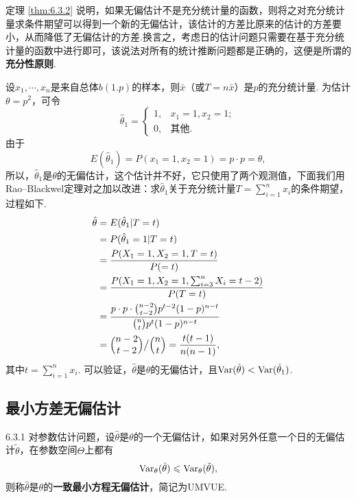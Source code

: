 定理 \ref{thm:6.3.2} 说明，如果无偏估计不是充分统计量的函数，则将之对充分统计量求条件期望可以得到一个新的无偏估计，该估计的方差比原来的估计的方差要小，从而降低了无偏估计的方差.换言之，考虑日的估计问题只需要在基于充分统计量的函数中进行即可，该说法对所有的统计推断问题都是正确的，这便是所谓的\textbf{充分性原则}. 

\begin{example}\label{exam:6.3.1}
  设$x_1,\cdots,x_n$是来自总体$b(1.p)$的样本，则$\bar x$（或$T=n\bar x$）是$p$的充分统计量. 为估计$\theta=p^2$，可令
  \[
    \hat\theta_1 = \begin{cases}
      1, & x_1=1, x_2=1; \\
      0, & \text{其他}.
    \end{cases}
  \]
  由于
  \[
    E(\hat\theta_1) = P(x_1=1,x_2=1) = p\cdot p =\theta,
  \]
  所以，$\hat\theta_1$是$\theta$的无偏估计，这个估计并不好，它只使用了两个观测值，下面我们用Rao--Blackwel定理对之加以改进：求$\hat\theta_1$关于充分统计量$T=\sum_{i=1}^nx_i$的条件期望，过程如下.
  \begin{align*}
    \hat\theta & = E(\hat\theta_1 | T=t) \\
    & = P(\hat\theta_1 = 1 | T=t) \\
    & = \frac{P(X_1=1,X_2=1,T=t)}{P(=t)} \\
    & = \frac{P\left( X_1=1,X_2=1,\sum_{i=3}^nX_i=t-2 \right)}{P(T=t)} \\
    & = \frac{p\cdot p\cdot \binom{n-2}{t-2}p^{t-2}(1-p)^{n-t}}{\binom ntp^t(1-p)^{n-t}} \\
    & = \Binom{n-2}{t-2}\big/\Binom nt  = \frac{t(t-1)}{n(n-1)},
  \end{align*}
  其中$t=\sum_{i=1}^nx_i$. 可以验证，$\hat\theta$是$\theta$的无偏估计，且$\operatorname{Var}(\hat\theta)<\operatorname{Var}(\hat\theta_1)$.
\end{example}

\subsection{最小方差无偏估计\label{ssec:6.3.2}}
\begin{definition}{}{6.3.1}
  对参数估计问题，设$\hat\theta$是$\theta$的一个无偏估计，如果对另外任意一个日的无偏估计$\tilde\theta$，在参数空间$\Theta$上都有
  \begin{equation}\label{eq6.3.5}
    \operatorname{Var}_\theta(\hat\theta) \leqslant \operatorname{Var}_\theta(\tilde\theta),
  \end{equation}
  则称$\hat\theta$是$\theta$的\textbf{一致最小方程无偏估计}，简记为UMVUE. 
\end{definition}

